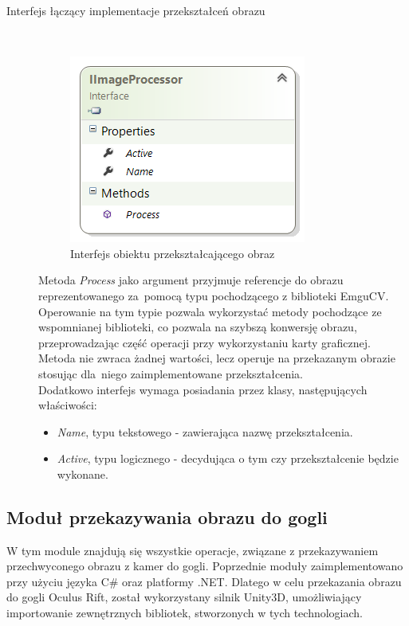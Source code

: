 \documentclass[a4paper,11pt,twoside]{report}
\theoremstyle{definition}
\begin{document}
\begin{description}
\item [Interfejs łączący implementacje przekształceń obrazu] \hfill \\

\begin{figure}[h]
\centering
\includegraphics[scale=0.9]{images/IImageProcessor}
\caption[Przekształcenie diagram diagram]{Interfejs obiektu przekształcającego obraz}
\end{figure}

Metoda \textit{Process} jako argument przyjmuje referencje do obrazu reprezentowanego za~pomocą typu pochodzącego z biblioteki EmguCV. Operowanie na tym typie pozwala wykorzystać metody pochodzące ze wspomnianej biblioteki, co pozwala na szybszą konwersję obrazu, przeprowadzając część operacji przy wykorzystaniu karty graficznej. Metoda nie zwraca żadnej wartości, lecz operuje na przekazanym obrazie stosując dla~niego zaimplementowane przekształcenia.  \\
Dodatkowo interfejs wymaga posiadania przez klasy, następujących właściwości:
\begin{itemize}
\item  \textit{Name}, typu tekstowego - zawierająca nazwę przekształcenia.
\item \textit{Active}, typu logicznego -  decydująca o tym czy przekształcenie będzie wykonane.
\end{itemize}

\end{description}

\subsection{Moduł przekazywania obrazu do gogli}

W tym module znajdują się wszystkie operacje, związane z przekazywaniem przechwyconego obrazu z kamer do gogli. Poprzednie moduły zaimplementowano przy użyciu języka C\# oraz  platformy .NET. Dlatego w celu przekazania obrazu do gogli Oculus Rift, został wykorzystany silnik Unity3D, umożliwiający importowanie zewnętrznych bibliotek, stworzonych w tych technologiach.
\end{document}
